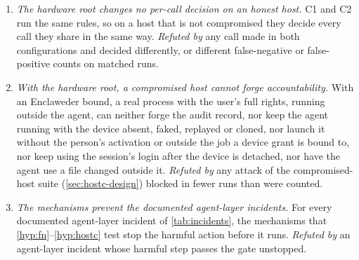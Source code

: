 \documentclass[11pt]{article}
\newcommand{\dev}{Enclaweder}
\newcommand{\cz}{Enclawed Code}
\begin{document}
\begin{enumerate}[label=\textbf{H\arabic*}, ref=H\arabic*, leftmargin=*]
  follow the tool, the permission mode and the command text, \cz{} puts
  fewer calls per run to a person in every mode in which native Claude
  Code asks, and its decision follows what an action does, not how it is
  phrased. \emph{Refuted by} a mode in which \cz{} needs a person at
  least as often per run as native Claude Code, a share of actions with
  mixed decisions across phrasings that is not lower than native Claude
  Code's, or phrasings with the same effect that get different decisions.
\item\label{hyp:same} \emph{The hardware root changes no per-call
  decision on an honest host.} C1 and C2 run the same rules, so on a
  host that is not compromised they decide every call they share in the
  same way. \emph{Refuted by} any call made in both configurations and decided
  differently, or different false-negative or false-positive counts on
  matched runs.
\item\label{hyp:hostc} \emph{With the hardware root, a compromised host
  cannot forge accountability.} With an \dev{} bound, a real process
  with the user's full rights, running outside the agent, can neither
  forge the audit record, nor keep the agent running with the device
  absent, faked, replayed or cloned, nor launch it without the person's
  activation or outside the job a device grant is bound to, nor keep
  using the session's login after the device is detached, nor have the
  agent use a file changed outside it. \emph{Refuted by} any attack of
  the compromised-host suite (\cref{sec:hostc-design}) blocked in fewer
  runs than were counted.
\item\label{hyp:inc} \emph{The mechanisms prevent the documented
  agent-layer incidents.} For every documented agent-layer incident of
  \cref{tab:incidents}, the mechanisms that \ref{hyp:fn}--\ref{hyp:hostc}
  test stop the harmful action before it runs. \emph{Refuted by} an
  agent-layer incident whose harmful step passes the gate unstopped.
\end{enumerate}
\end{document}
